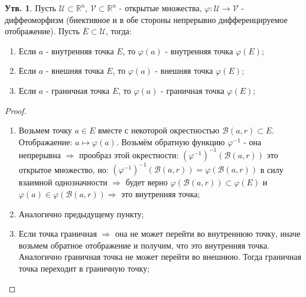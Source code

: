 \documentclass[12pt]{article}
\newcommand{\MR}{\mathbb{R}}
\newcommand{\MU}{\mathcal{U}}
\newcommand{\MV}{\mathcal{V}}
\newcommand{\MB}{\mathcal{B}}
\theoremstyle{definition}
\newtheorem{prop}{Утв.}
\newcommand{\ovl}[1]{\overline{#1}}
\begin{document}
\begin{prop}
	Пусть $\MU \subset \MR^n, \, \MV \subset \MR^n$ - открытые множества, $\varphi \colon \MU \to \MV$ - диффеоморфизм (биективное и в обе стороны непрерывно дифференцируемое отображение). Пусть $\ovl{E} \subset \MU$, тогда:
	\begin{enumerate}[label=\arabic*)]
		\item Если $a$ - внутренняя точка $E$, то $\varphi(a)$ - внутренняя точка $\varphi(E)$; 
		\item Если $a$ - внешняя точка $E$, то $\varphi(a)$ - внешняя точка $\varphi(E)$;
		\item Если $a$ - граничная точка $E$, то $\varphi(a)$ - граничная точка $\varphi(E)$;
	\end{enumerate}
\end{prop}
\begin{proof}\hfill
	\begin{enumerate}[label=\arabic*)]
		\item Возьмем точку $a \in E$ вместе с некоторой окрестностью $\MB(a,r) \subset E$. Отображаение: $a \mapsto \varphi(a)$. Возьмём обратную функцию $\varphi^{-1}$ - она непрерывна $\Rightarrow$ прообраз этой окрестности: $(\varphi^{-1})^{-1}\left(\MB(a,r)\right)$ это открытое множество, но: $(\varphi^{-1})^{-1}\left(\MB(a,r)\right) = \varphi\left(\MB(a,r)\right)$ в силу взаимной однозначности $\Rightarrow$ будет верно $\varphi\left(\MB(a,r)\right) \subset \varphi(E)$ и $\varphi(a) \in \varphi\left(\MB(a,r)\right) \Rightarrow$ это внутренняя точка;
		\item Аналогично предыдущему пункту;
		\item Если точка граничная $\Rightarrow$ она не может перейти во внутреннюю точку, иначе возьмем обратное отображение и получим, что это внутренняя точка. Аналогично граничная точка не может перейти во внешнюю. Тогда граничная точка переходит в граничную точку;
	\end{enumerate}
\end{proof}
\end{document}
